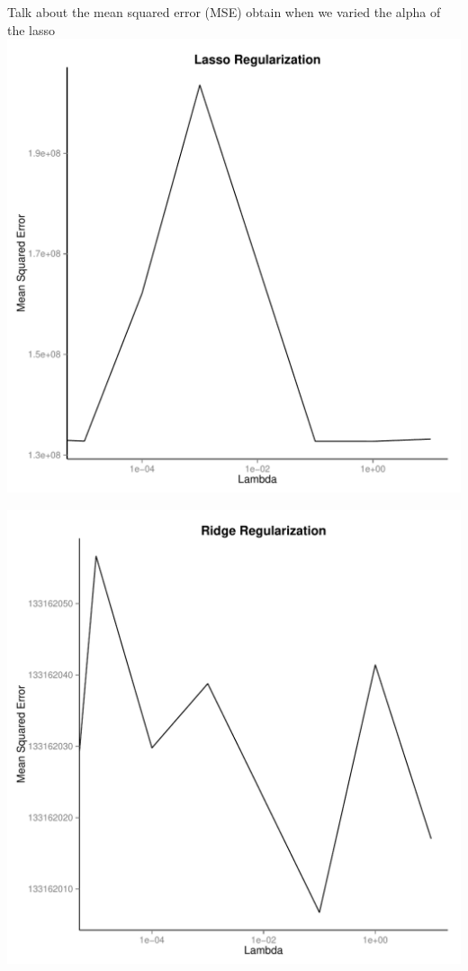 \documentclass[conference]{IEEEtran}\usepackage[]{graphicx}\usepackage[]{color}
\makeatletter
\def\maxwidth{ %
  \ifdim\Gin@nat@width>\linewidth
    \linewidth
  \else
    \Gin@nat@width
  \fi
}
\newenvironment{knitrout}{}{} %
\makeatother
\begin{document}
Talk about the mean squared error (MSE) obtain when we varied the alpha of the lasso 
\begin{knitrout}
\color{fgcolor}
\includegraphics[width=\maxwidth]{figure/unnamed-chunk-2-1} 

\end{knitrout}

\begin{knitrout}
\color{fgcolor}
\includegraphics[width=\maxwidth]{figure/unnamed-chunk-3-1} 

\end{knitrout}
\end{document}
